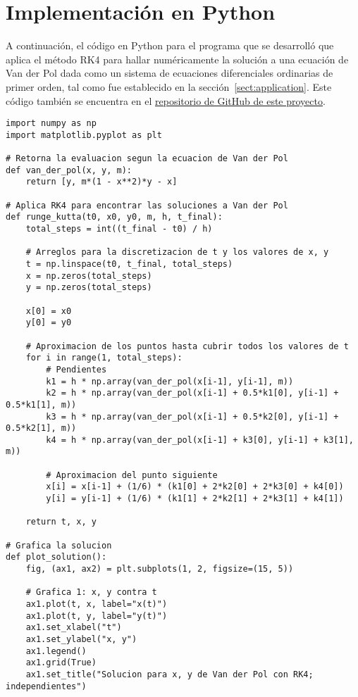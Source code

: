 \section{Implementación en Python}\label{sect:python}

A continuación, el código en Python para el programa que se desarrolló que aplica el método RK4 para hallar numéricamente la solución a una ecuación de Van der Pol dada como un sistema de ecuaciones diferenciales ordinarias de primer orden, tal como fue establecido en la sección~\ref{sect:application}. Este código también se encuentra en el \href{https://github.com/camargomau/runge-kutta}{repositorio de GitHub de este proyecto}.

\begin{lstlisting}[style=python]
import numpy as np
import matplotlib.pyplot as plt

# Retorna la evaluacion segun la ecuacion de Van der Pol
def van_der_pol(x, y, m):
    return [y, m*(1 - x**2)*y - x]

# Aplica RK4 para encontrar las soluciones a Van der Pol
def runge_kutta(t0, x0, y0, m, h, t_final):
    total_steps = int((t_final - t0) / h)

	# Arreglos para la discretizacion de t y los valores de x, y
    t = np.linspace(t0, t_final, total_steps)
    x = np.zeros(total_steps)
    y = np.zeros(total_steps)

    x[0] = x0
    y[0] = y0

	# Aproximacion de los puntos hasta cubrir todos los valores de t
    for i in range(1, total_steps):
		# Pendientes
        k1 = h * np.array(van_der_pol(x[i-1], y[i-1], m))
        k2 = h * np.array(van_der_pol(x[i-1] + 0.5*k1[0], y[i-1] + 0.5*k1[1], m))
        k3 = h * np.array(van_der_pol(x[i-1] + 0.5*k2[0], y[i-1] + 0.5*k2[1], m))
        k4 = h * np.array(van_der_pol(x[i-1] + k3[0], y[i-1] + k3[1], m))

		# Aproximacion del punto siguiente
        x[i] = x[i-1] + (1/6) * (k1[0] + 2*k2[0] + 2*k3[0] + k4[0])
        y[i] = y[i-1] + (1/6) * (k1[1] + 2*k2[1] + 2*k3[1] + k4[1])

    return t, x, y

# Grafica la solucion
def plot_solution():
    fig, (ax1, ax2) = plt.subplots(1, 2, figsize=(15, 5))

    # Grafica 1: x, y contra t
    ax1.plot(t, x, label="x(t)")
    ax1.plot(t, y, label="y(t)")
    ax1.set_xlabel("t")
    ax1.set_ylabel("x, y")
    ax1.legend()
    ax1.grid(True)
    ax1.set_title("Solucion para x, y de Van der Pol con RK4; independientes")


\end{lstlisting}
